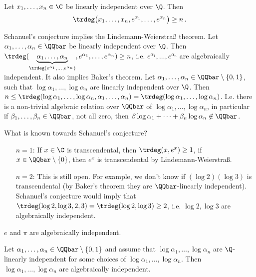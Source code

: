 \begin{conj} 
	Let \( x_1, \dotsc, x_n \in \C \) be linearly independent over \( \Q \).
	Then
	\[ \trdeg \big( x_1, \dotsc, x_n, e^{x_1}, \dotsc, e^{x_n} \big) \geq n \,. \]
\end{conj}

Schanuel's conjecture implies the Lindemann-Weierstraß theorem.
Let \( \alpha_1, \dotsc, \alpha_n \in \QQbar \) be linearly independent over \( \Q \).
Then \( \trdeg (\underbrace{\alpha_1, \dotsc, \alpha_n}_{\trdeg(e^{\alpha_1}, \dotsc, e^{\alpha_n})}, e^{\alpha_1}, \dotsc, e^{\alpha_n}) \geq n \), i.e. \( e^{\alpha_1}, \dotsc, e^{\alpha_n} \) are algebraically independent.
It also implies Baker's theorem.
Let \( \alpha_1, \dotsc, \alpha_n \in \QQbar \setminus \{0,1\} \), such that \( \log \alpha_1, \dotsc, \log\alpha_n \) are linearly independent over \( \Q \).
Then \( n \leq \trdeg (\log\alpha_1, \dotsc, \log\alpha_n, \alpha_1, \dotsc, \alpha_n) = \trdeg(\log\alpha_1, \dotsc, \log\alpha_n) \).
I.e. there is a non-trivial algebraic relation over \( \QQbar \) of \( \log\alpha_1, \dotsc, \log\alpha_n \), in particular if \( \beta_1, \dotsc, \beta_n \in \QQbar \), not all zero, then \( \beta\log\alpha_1 + \dots + \beta_n\log\alpha_n \not\in \QQbar \).

What is known towards Schanuel's conjecture?
\begin{itemize}
	\item[\( n=1 \):] If \( x \in \C \) is transcendental, then \( \trdeg (x, e^x) \geq 1 \), if \( x \in \QQbar \setminus \{0\} \), then \( e^x \) is transcendental by Lindemann-Weierstraß.
	\item[\( n=2 \):] This is still open.
		For example, we don't know if \( (\log 2)(\log 3) \) is transcendental (by Baker's theorem they are \( \QQbar \)-linearly independent).
		Schanuel's conjecture would imply that \( \trdeg(\log 2, \log 3, 2, 3) = \trdeg(\log 2, \log 3) \geq 2 \), i.e. \( \log 2, \log 3 \) are algebraically independent.
\end{itemize}

\begin{conj}
	\( e \) and \( \pi \) are algebraically independent.
\end{conj}

\begin{conj}
	Let \( \alpha_1, \dotsc, \alpha_n \in \QQbar \setminus \{0,1\} \) and assume that \( \log\alpha_1, \dotsc, \log\alpha_n \) are \( \Q \)-linearly independent for some choices of \( \log\alpha_1, \dotsc, \log\alpha_n \).
	Then \( \log\alpha_1, \dotsc, \log\alpha_n \) are algebraically independent.
\end{conj}

